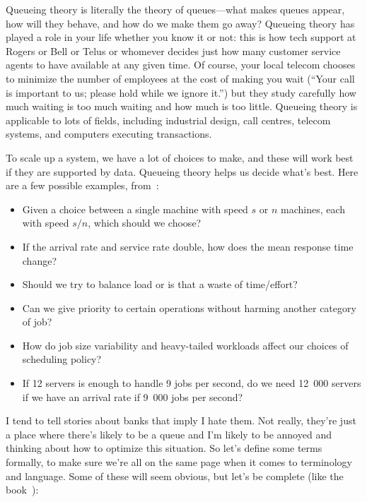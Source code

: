 \documentclass[a4paper]{report}
\begin{document}
Queueing theory is literally the theory of queues---what makes queues appear, how will they behave, and how do we make them go away? Queueing theory has played a role in your life whether you know it or not: this is how tech support at Rogers or Bell or Telus or whomever decides just how many customer service agents to have available at any given time. Of course, your local telecom chooses to minimize the number of employees at the cost of making you wait (``Your call is important to us; please hold while we ignore it.'') but they study carefully how much waiting is too much waiting and how much is too little. Queueing theory is applicable to lots of fields, including industrial design, call centres, telecom systems, and computers executing transactions. 

To scale up a system, we have a lot of choices to make, and these will work best if they are supported by data. Queueing theory helps us decide what's best. Here are a few possible examples, from~\cite{pmd}:

\begin{itemize}
 \item Given a choice between a single machine with speed $s$ or $n$ machines, each with speed $s/n$, which should we choose?
 \item If the arrival rate and service rate double, how does the mean response time change?
 \item Should we try to balance load or is that a waste of time/effort?
 \item Can we give priority to certain operations without harming another category of job?
 \item How do job size variability and heavy-tailed workloads affect our choices of scheduling policy?
 \item If 12 servers is enough to handle 9 jobs per second, do we need 12~000 servers if we have an arrival rate if 9~000 jobs per second?
\end{itemize}

I tend to tell stories about banks that imply I hate them. Not really, they're just a place where there's likely to be a queue and I'm likely to be annoyed and thinking about how to optimize this situation. So let's define some terms formally, to make sure we're all on the same page when it comes to terminology and language. Some of these will seem obvious, but let's be complete (like the book~\cite{swps}):
\end{document}

